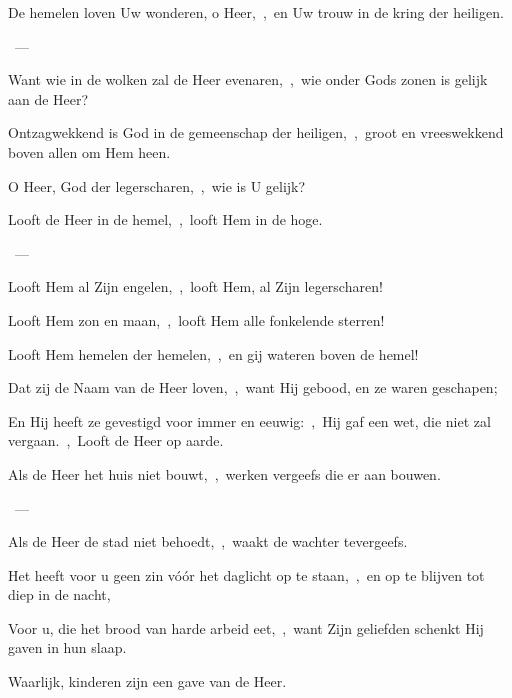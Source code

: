 \documentclass[12pt,twoside,a5paper]{article}
\begin{document}

\begin{halfparskip}
  De hemelen loven Uw wonderen, o Heer,~\sep\ en Uw trouw in de kring der heiligen.

  ~--- 

  Want wie in de wolken zal de Heer evenaren,~\sep\ wie onder Gods zonen is gelijk aan de Heer?

  Ontzagwekkend is God in de gemeenschap der heiligen,~\sep\ groot en vreeswekkend boven allen om Hem heen.

  O Heer, God der legerscharen,~\sep\ wie is U gelijk?
\end{halfparskip}


\begin{halfparskip}
  Looft de Heer in de hemel,~\sep\ looft Hem in de hoge.

  ~--- 

  Looft Hem al Zijn engelen,~\sep\ looft Hem, al Zijn legerscharen!

  Looft Hem zon en maan,~\sep\ looft Hem alle fonkelende sterren!

  Looft Hem hemelen der hemelen,~\sep\ en gij wateren boven de hemel!

  Dat zij de Naam van de Heer loven,~\sep\ want Hij gebood, en ze waren geschapen;

  En Hij heeft ze gevestigd voor immer en eeuwig:~\sep\ Hij gaf een wet, die niet zal vergaan.~\sep\  Looft de Heer op aarde.
\end{halfparskip}


\begin{halfparskip}
  Als de Heer het huis niet bouwt,~\sep\ werken vergeefs die er aan bouwen.

  ~--- 

  Als de Heer de stad niet behoedt,~\sep\ waakt de wachter tevergeefs.

  Het heeft voor u geen zin vóór het daglicht op te staan,~\sep\ en op te blijven tot diep in de nacht,

  Voor u, die het brood van harde arbeid eet,~\sep\ want Zijn geliefden schenkt Hij gaven in hun slaap.

  Waarlijk, kinderen zijn een gave van de Heer.
\end{halfparskip}
\end{document}
